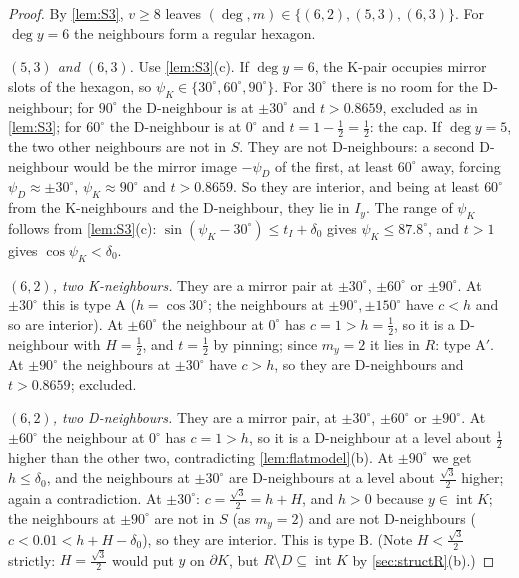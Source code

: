 \documentclass[11pt]{amsart}
\theoremstyle{definition}
\theoremstyle{remark}
\begin{document}
\begin{proof}
By \cref{lem:S3}, $v\ge8$ leaves $(\deg,m)\in\{(6,2),(5,3),(6,3)\}$. For $\deg y=6$ the neighbours form a regular hexagon.

\emph{$(5,3)$ and $(6,3)$.} Use \cref{lem:S3}(c). If $\deg y=6$, the K-pair occupies mirror slots of the hexagon, so $\psi_K\in\{30^\circ,60^\circ,90^\circ\}$. For $30^\circ$ there is no room for the D-neighbour; for $90^\circ$ the D-neighbour is at $\pm30^\circ$ and $t>0.8659$, excluded as in \cref{lem:S3}; for $60^\circ$ the D-neighbour is at $0^\circ$ and $t=1-\frac12=\frac12$: the cap. If $\deg y=5$, the two other neighbours are not in $S$. They are not D-neighbours: a second D-neighbour would be the mirror image $-\psi_D$ of the first, at least $60^\circ$ away, forcing $\psi_D\approx\pm30^\circ$, $\psi_K\approx90^\circ$ and $t>0.8659$. So they are interior, and being at least $60^\circ$ from the K-neighbours and the D-neighbour, they lie in $I_y$. The range of $\psi_K$ follows from \cref{lem:S3}(c): $\sin(\psi_K-30^\circ)\le t_I+\delta_0$ gives $\psi_K\le87.8^\circ$, and $t>1$ gives $\cos\psi_K<\delta_0$.

\emph{$(6,2)$, two K-neighbours.} They are a mirror pair at $\pm30^\circ$, $\pm60^\circ$ or $\pm90^\circ$. At $\pm30^\circ$ this is type A ($h=\cos30^\circ$; the neighbours at $\pm90^\circ,\pm150^\circ$ have $c<h$ and so are interior). At $\pm60^\circ$ the neighbour at $0^\circ$ has $c=1>h=\frac12$, so it is a D-neighbour with $H=\frac12$, and $t=\frac12$ by pinning; since $m_y=2$ it lies in $R$: type A$'$. At $\pm90^\circ$ the neighbours at $\pm30^\circ$ have $c>h$, so they are D-neighbours and $t>0.8659$; excluded.

\emph{$(6,2)$, two D-neighbours.} They are a mirror pair, at $\pm30^\circ$, $\pm60^\circ$ or $\pm90^\circ$. At $\pm60^\circ$ the neighbour at $0^\circ$ has $c=1>h$, so it is a D-neighbour at a level about $\frac12$ higher than the other two, contradicting \cref{lem:flatmodel}(b). At $\pm90^\circ$ we get $h\le\delta_0$, and the neighbours at $\pm30^\circ$ are D-neighbours at a level about $\frac{\sqrt3}2$ higher; again a contradiction. At $\pm30^\circ$: $c=\frac{\sqrt3}2=h+H$, and $h>0$ because $y\in\operatorname{int}K$; the neighbours at $\pm90^\circ$ are not in $S$ (as $m_y=2$) and are not D-neighbours ($c<0.01<h+H-\delta_0$), so they are interior. This is type B. (Note $H<\frac{\sqrt3}2$ strictly: $H=\frac{\sqrt3}2$ would put $y$ on $\partial K$, but $R\setminus D\subseteq\operatorname{int}K$ by \cref{sec:structR}(b).)


\end{proof}
\end{document}

